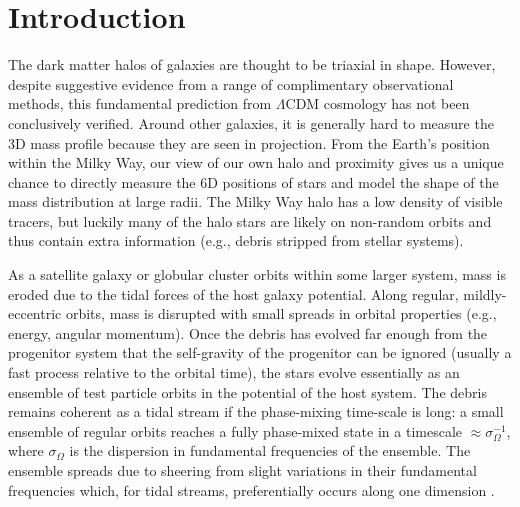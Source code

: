 \documentclass[letterpaper,12pt,preprint]{aastex}
\begin{document}
\keywords{
}

\section{Introduction}\label{sec:introduction}

The dark matter halos of galaxies are thought to be triaxial in shape. However, despite suggestive evidence from a range of complimentary observational methods, this fundamental prediction from $\Lambda$CDM cosmology has not been conclusively verified. Around other galaxies, it is generally hard to measure the 3D mass profile because they are seen in projection. From the Earth's position within the Milky Way, our view of our own halo and proximity gives us a unique chance to directly measure the 6D positions of stars and model the shape of the mass distribution at large radii. The Milky Way halo has a low density of visible tracers, but luckily many of the halo stars are likely on non-random orbits and thus contain extra information (e.g., debris stripped from stellar systems).

As a satellite galaxy or globular cluster orbits within some larger system, mass is eroded due to the tidal forces of the host galaxy potential. Along regular, mildly-eccentric orbits, mass is disrupted with small spreads in orbital properties (e.g., energy, angular momentum). Once the debris has evolved far enough from the progenitor system that the self-gravity of the progenitor can be ignored (usually a fast process relative to the orbital time), the stars evolve essentially as an ensemble of test particle orbits in the potential of the host system. The debris remains coherent as a tidal stream if the phase-mixing time-scale is long: a small ensemble of regular orbits reaches a fully phase-mixed state in a timescale $\approx\sigma_\Omega^{-1}$, where $\sigma_\Omega$ is the dispersion in fundamental frequencies of the ensemble. The ensemble spreads due to sheering from slight variations in their fundamental frequencies which, for tidal streams, preferentially occurs along one dimension \citep{merritt96, helmi99}. 
\end{document}
